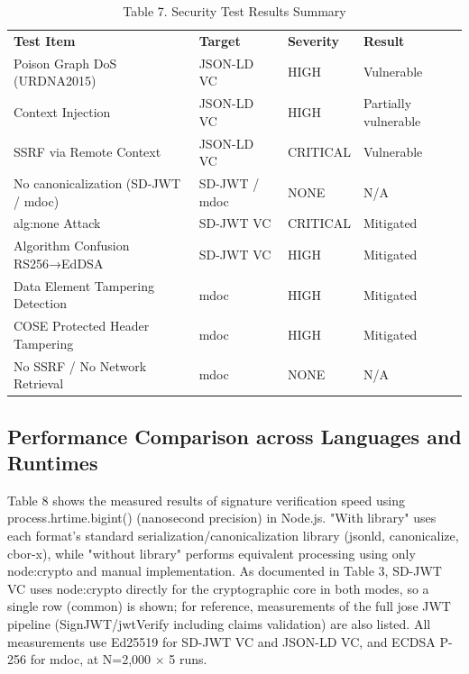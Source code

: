 \documentclass[conference]{IEEEtran}
\begin{document}
\begin{table}[!t]
\centering
\caption{Table 7. Security Test Results Summary}\label{tab:7}
\footnotesize
\begin{tabular}{>{\raggedright\arraybackslash}p{}lll}
\toprule

\textbf{Test Item} & \textbf{Target} & \textbf{Severity} & \textbf{Result}\tabularnewline
Poison Graph DoS (URDNA2015) & JSON-LD VC & HIGH & Vulnerable\tabularnewline
Context Injection & JSON-LD VC & HIGH & Partially vulnerable\tabularnewline
SSRF via Remote Context & JSON-LD VC & CRITICAL & Vulnerable\tabularnewline
No canonicalization (SD-JWT / mdoc) & SD-JWT / mdoc & NONE & N/A\tabularnewline
alg:none Attack & SD-JWT VC & CRITICAL & Mitigated\tabularnewline
Algorithm Confusion RS256→EdDSA & SD-JWT VC & HIGH & Mitigated\tabularnewline
Data Element Tampering Detection & mdoc & HIGH & Mitigated\tabularnewline
COSE Protected Header Tampering & mdoc & HIGH & Mitigated\tabularnewline
No SSRF / No Network Retrieval & mdoc & NONE & N/A\tabularnewline
\bottomrule
\end{tabular}
\end{table}

\subsection{Performance Comparison across Languages and Runtimes}

Table 8 shows the measured results of signature verification speed using process.hrtime.bigint() (nanosecond precision) in Node.js. "With library" uses each format's standard serialization/canonicalization library (jsonld, canonicalize, cbor-x), while "without library" performs equivalent processing using only node:crypto and manual implementation. As documented in Table 3, SD-JWT VC uses node:crypto directly for the cryptographic core in both modes, so a single row (common) is shown; for reference, measurements of the full jose JWT pipeline (SignJWT/jwtVerify including claims validation) are also listed. All measurements use Ed25519 for SD-JWT VC and JSON-LD VC, and ECDSA P-256 for mdoc, at N=2,000 $\times$ 5 runs.
\end{document}
